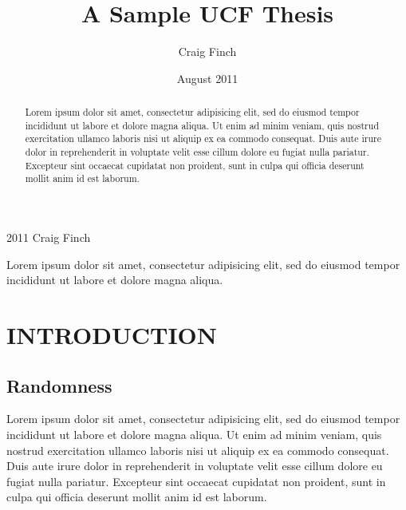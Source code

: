 \documentclass[letterpaper, english]{UCFthesis}
\begin{document}

\title{A Sample UCF Thesis}
\author{Craig Finch}
\date{August 2011}
\maketitle
\thispagestyle{empty}

\begin{UCFcopyright}
2011 Craig Finch
\end{UCFcopyright}

\newpage
\begin{abstract}
Lorem ipsum dolor sit amet, consectetur adipisicing elit, sed do eiusmod tempor incididunt ut labore et dolore magna aliqua. Ut enim ad minim veniam, quis nostrud exercitation ullamco laboris nisi ut aliquip ex ea commodo consequat. Duis aute irure dolor in reprehenderit in voluptate velit esse cillum dolore eu fugiat nulla pariatur. Excepteur sint occaecat cupidatat non proident, sunt in culpa qui officia deserunt mollit anim id est laborum.
\end{abstract}

\begin{acknowledgements}
Lorem ipsum dolor sit amet, consectetur adipisicing elit, sed do eiusmod tempor incididunt ut labore et dolore magna aliqua.
\end{acknowledgements}

\clearpage
{} \label{tableofcontents}
\tableofcontents

\newpage
{} \label{listoffig}
\listoffigures

\newpage
{} \label{listoftab}
\listoftables

\newpage
{}

\chapter{INTRODUCTION}

\section{Randomness}
Lorem ipsum dolor sit amet, consectetur adipisicing elit, sed do eiusmod tempor incididunt ut labore et dolore magna aliqua. Ut enim ad minim veniam, quis nostrud exercitation ullamco laboris nisi ut aliquip ex ea commodo consequat. Duis aute irure dolor in reprehenderit in voluptate velit esse cillum dolore eu fugiat nulla pariatur. Excepteur sint occaecat cupidatat non proident, sunt in culpa qui officia deserunt mollit anim id est laborum.
\end{document}
